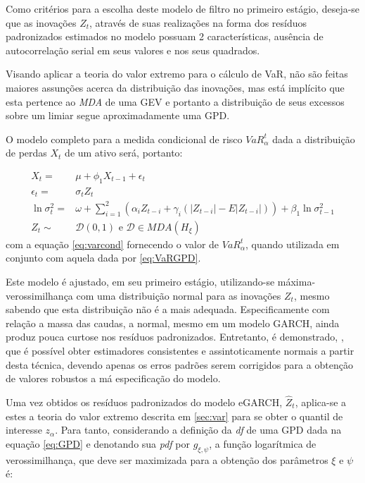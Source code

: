 \documentclass[review]{elsarticle}
\theoremstyle{definition}
\begin{document}
Como critérios para a escolha deste modelo de filtro no primeiro estágio, deseja-se que as inovações $Z_t$, através de suas realizações na forma dos resíduos padronizados estimados no modelo possuam 2 características, ausência de autocorrelação serial em seus valores e nos seus quadrados.

Visando aplicar a teoria do valor extremo para o cálculo de VaR, não são feitas maiores assunções acerca da distribuição das inovações, mas está implícito que esta pertence ao \emph{MDA} de uma GEV e portanto a distribuição de seus excessos sobre um limiar segue aproximadamente uma GPD.

O modelo completo para a medida condicional de risco $VaR_\alpha^t$ dada a distribuição de perdas $X_t$ de um ativo será, portanto:

\begin{align}
X_t=&\mu+ \phi_1 X_{t-1}+\epsilon_t \\
\epsilon_t=&\sigma_t Z_t\\
\ln\sigma_t^2=&\omega+ \sum_{i=1}^{2}\left(\alpha_i Z_{t-i}+ \gamma_i(|Z_{t-i}|-E|Z_{t-i}|)\right)+ \beta_1 \ln\sigma_{t-1}^2 \label{eq:sigma2} \\
Z_t\sim &\mathcal{D}(0,1) \text{ e } \mathcal{D} \in MDA(H_\xi)
\end{align}
com a equação \eqref{eq:varcond} fornecendo o valor de $VaR_\alpha^t$, quando utilizada em conjunto com aquela dada por \eqref{eq:VaRGPD}.

Este modelo é ajustado, em seu primeiro estágio, utilizando-se máxima-verossimilhança com uma distribuição normal para as inovações $Z_t$, mesmo sabendo que esta distribuição não é a mais adequada. Especificamente com relação a massa das caudas, a normal, mesmo em um modelo GARCH, ainda produz pouca curtose nos resíduos padronizados. Entretanto, é demonstrado, \cite[Capítulo 4]{Gourieroux1997}, que é possível obter estimadores consistentes e assintoticamente normais a partir desta técnica, devendo apenas os erros padrões serem corrigidos para a obtenção de valores robustos a má especificação do modelo.

Uma vez obtidos os resíduos padronizados do modelo eGARCH, $\hat{Z}_t$, aplica-se a estes a teoria do valor extremo descrita em \ref{sec:var} para se obter o quantil de interesse $z_\alpha$. Para tanto, considerando a definição da \emph{df} de uma GPD dada na equação \eqref{eq:GPD} e denotando sua \emph{pdf} por $g_{\xi, \psi}$, a função logarítmica de verossimilhança, que deve ser maximizada para a obtenção dos parâmetros $\xi$ e $\psi$ é:
\end{document}
